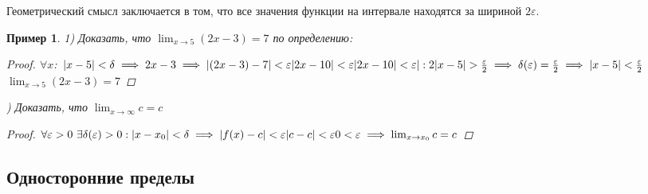 \documentclass[12pt, a4paper]{article}
\newtheorem{example}{Пример}[subsection]
\theoremstyle{remark}
\newcommand{\Y}{\mathbb{\forall}}
\newcommand{\F}{\mathbb{\exists}}
\newcommand{\E}{\mathbb{\varepsilon}}
\begin{document}
	Геометрический смысл заключается в том, что все значения функции на интервале находятся за шириной $2\E$. 
	
	\begin{example}
		1) Доказать, что $\lim_{x \to 5} (2x - 3) = 7$ по определению:
		\begin{proof}
			$\Y x$: $|x - 5| < \delta \implies 2x - 3 \implies |(2x - 3) - 7| < \E \\ |2x - 10| < \E \\ |2x - 10| < \E |:2 \\ |x - 5| > \frac{\E}{2} \implies \delta(\E) = \frac{\E}{2} \implies |x - 5| < \frac{\E}{2}$ \\ $\lim_{x \to 5} (2x - 3) = 7$
		\end{proof}
		
		) Доказать, что $\lim_{x \to \infty} c = c$
		\begin{proof}
			$\Y\E > 0 \ \F\delta(\E) > 0: |x - x_0| < \delta \implies |f(x) - c| < \E \\ |c - c| < \E \\ 0 < \E \implies \lim_{x \to x_0} c = c$
		\end{proof}
	\end{example}
	
	\newpage
	
	\subsection{Односторонние пределы}
	
\end{document}
